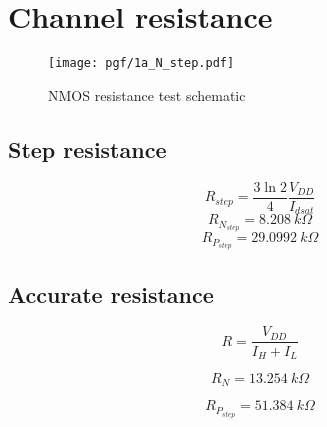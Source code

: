 \section{Channel resistance}

\begin{figure}[!h]
	\centering
	\texttt{[image: pgf/1a\_N\_step.pdf]}
	\caption{NMOS resistance test schematic}
\end{figure}

\subsection{Step resistance}
	$$ R_{step} = \dfrac{3 \ln{2}}{4} \dfrac{V_{DD}}{I_{dsat}} $$
	$$ R_{N_{step}} = 8.208~k \Omega$$
	$$ R_{P_{step}} = 29.0992 ~k \Omega$$

\subsection{Accurate resistance}
	$$ R = \dfrac{V_{DD}}{I_H + I_L} $$

	$$ R_{N} = 13.254 ~k\Omega$$

	$$ R_{P_{step}} = 51.384 ~k\Omega$$
